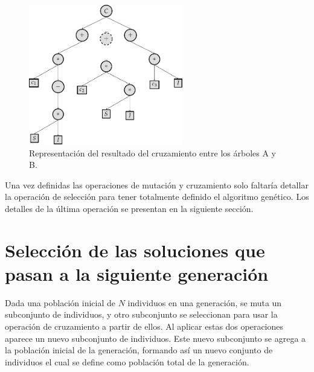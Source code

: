 \begin{center}

    \begin{figure}[H]
        \centering
        \includegraphics[width=0.6\textwidth]{"figures/cross_example_3.pdf"}
        \caption{Representación del resultado del cruzamiento entre los árboles A y B.}
        \label{tikzpicture:cross_example_2}
    \end{figure}
\end{center}

Una vez definidas las operaciones de mutación y cruzamiento solo faltaría detallar la operación de selección para tener totalmente definido el algoritmo genético. Los detalles de la última operación se presentan en la siguiente sección.

\section{Selección de las soluciones que pasan a la siguiente generación}\label{section:selection}

Dada una población inicial de $N$ individuos en una generación, se muta un subconjunto de individuos, y otro subconjunto se seleccionan para usar la operación de cruzamiento a partir de ellos. Al aplicar estas dos operaciones aparece un nuevo subconjunto de individuos. Este nuevo subconjunto se agrega a la población inicial de la generación, formando así un nuevo conjunto de individuos el cual se define como población total de la generación.


